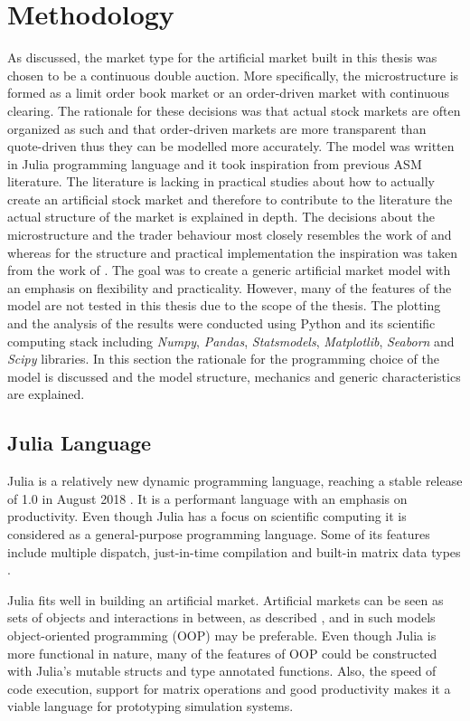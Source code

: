 
\section{Methodology}

As discussed, the market type for the artificial market built in this thesis was chosen 
to be a continuous double auction. More specifically, the microstructure is formed as a 
limit order book market or an order-driven market with continuous clearing. The rationale 
for these decisions was that actual stock markets are often organized as such and that 
order-driven markets are more transparent than quote-driven thus they can be modelled more 
accurately. The model was written in Julia
programming language and it took inspiration from previous ASM literature.
The literature is lacking in practical studies about how to actually create
an artificial stock market and therefore to contribute to the literature 
the actual structure of the market is explained in depth. The decisions 
about the microstructure and the trader behaviour most closely resembles the 
work of \citet{Genoa01} and \citet{Raberto05} whereas for the structure and 
practical implementation the inspiration was taken from the work of \citet{Ben12}. 
The goal was to create a generic artificial market model with an emphasis on flexibility 
and practicality. However, many of the features of the model are not tested in this thesis 
due to the scope of the thesis. The plotting and the analysis of the results were 
conducted using Python and its scientific computing stack including \textit{Numpy}, \textit{Pandas}, 
\textit{Statsmodels}, \textit{Matplotlib}, \textit{Seaborn} and \textit{Scipy} libraries. In this section the rationale 
for the programming choice of the model is discussed and the model structure, 
mechanics and generic characteristics are explained.

\subsection{Julia Language}
Julia is a relatively new dynamic programming language, 
reaching a stable release of 1.0 in August 2018 \citep{JuliaV1}.
It is a performant language with an emphasis
on productivity. Even though Julia has a focus on scientific 
computing it is considered as a general-purpose programming
language. Some of its features include
multiple dispatch, just-in-time compilation and built-in
matrix data types \citep{Julia}.

Julia fits well in building an artificial market.
Artificial markets can be seen as sets of objects
and interactions in between, as described \citet{Ben12},
and in such models object-oriented programming (OOP)
may be preferable. Even though Julia is more functional in nature, 
many of the features of OOP could be constructed with Julia's mutable structs 
and type annotated functions. Also, the speed of code execution, 
support for matrix operations and good productivity makes 
it a viable language for prototyping simulation systems. 


